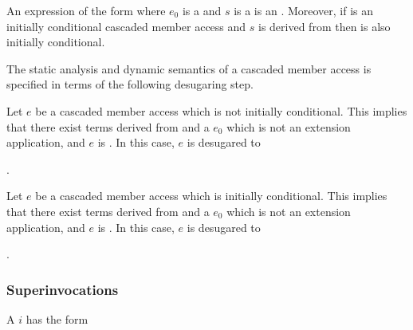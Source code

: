 \documentclass[makeidx]{article}
\begin{document}
{\LMHash{}%
An expression of the form  where
$e_0$ is a  and
$s$ is a  is an
.
Moreover, if  is
an initially conditional cascaded member access and
$s$ is derived from  then
 is also initially conditional.


\LMHash{}%
The static analysis and dynamic semantics of a cascaded member access
is specified in terms of the following desugaring step.

\LMHash{}%
Let $e$ be a cascaded member access which is not initially conditional.
This implies that there exist terms 
derived from 
and a  $e_0$
which is not an extension application,
and $e$ is .
In this case, $e$ is desugared to

\noindent
{}.

\LMHash{}%
Let $e$ be a cascaded member access which is initially conditional.
This implies that there exist terms 
derived from 
and a  $e_0$
which is not an extension application,
and $e$ is .
In this case, $e$ is desugared to

\noindent
{}.



\subsubsection{Superinvocations}


\LMHash{}%
A  $i$ has the form
%

}
\end{document}
